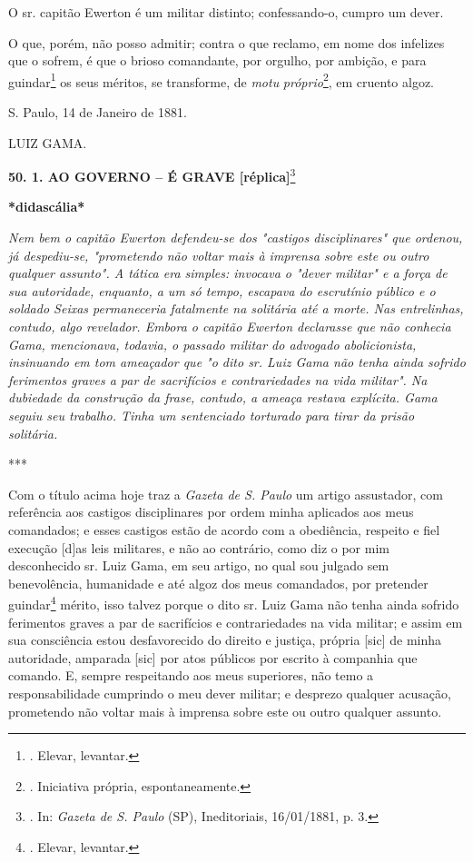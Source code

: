 O sr. capitão Ewerton é um militar distinto; confessando-o, cumpro um
dever.

O que, porém, não posso admitir; contra o que reclamo, em nome dos
infelizes que o sofrem, é que o brioso comandante, por orgulho, por
ambição, e para guindar\footnote{. Elevar, levantar.} os seus méritos,
se transforme, de \emph{motu} \emph{próprio}\footnote{. Iniciativa
  própria, espontaneamente.},
em cruento algoz.

S. Paulo, 14 de Janeiro de 1881.

LUIZ GAMA.

\textbf{50. 1. AO GOVERNO -- É GRAVE {[}réplica{]}}\footnote{. In:
  \emph{Gazeta de S. Paulo} (SP), Ineditoriais, 16/01/1881, p. 3.}

\textbf{*didascália*}

\emph{Nem bem o capitão Ewerton defendeu-se dos "castigos disciplinares"
que ordenou, já despediu-se, "prometendo não voltar mais à imprensa
sobre este ou outro qualquer assunto". A tática era simples: invocava o
"dever militar" e a força de sua autoridade, enquanto, a um só tempo,
escapava do escrutínio público e o soldado Seixas permaneceria
fatalmente na solitária até a morte. Nas entrelinhas, contudo, algo
revelador. Embora o capitão Ewerton declarasse que não conhecia Gama,
mencionava, todavia, o passado militar do advogado abolicionista,
insinuando em tom ameaçador que "o dito sr. Luiz Gama não tenha ainda
sofrido ferimentos graves a par de sacrifícios e contrariedades na vida
militar". Na dubiedade da construção da frase, contudo, a ameaça restava
explícita. Gama seguiu seu trabalho. Tinha um sentenciado torturado para
tirar da prisão solitária. }

***

Com o título acima hoje traz a \emph{Gazeta de S. Paulo} um artigo
assustador, com referência aos castigos disciplinares por ordem minha
aplicados aos meus comandados; e esses castigos estão de acordo com a
obediência, respeito e fiel execução {[}d{]}as leis militares, e não ao
contrário, como diz o por mim desconhecido sr. Luiz Gama, em seu artigo,
no qual sou julgado sem benevolência, humanidade e até algoz dos meus
comandados, por pretender guindar\footnote{. Elevar, levantar.}
mérito, isso talvez porque
o dito sr. Luiz Gama não tenha ainda sofrido ferimentos graves a par de
sacrifícios e contrariedades na vida militar; e assim em sua consciência
estou desfavorecido do direito e justiça, própria {[}sic{]} de minha
autoridade, amparada {[}sic{]} por atos públicos por escrito à companhia
que comando. E, sempre respeitando aos meus superiores, não temo a
responsabilidade cumprindo o meu dever militar; e desprezo qualquer
acusação, prometendo não voltar mais à imprensa sobre este ou outro
qualquer assunto.

